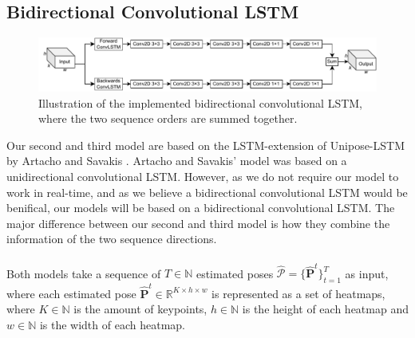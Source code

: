 \documentclass[./main.tex]{subfiles}
\begin{document}
\subsection{Bidirectional Convolutional LSTM}
\begin{figure}[htbp]
    \centering
    \includegraphics[width=\textwidth]{./entities/bi_conv_lstm.pdf}
    \caption{Illustration of the implemented bidirectional convolutional LSTM, where the two sequence orders are summed together.}
    \label{fig:bi_conv_lstm}
\end{figure}

\noindent Our second and third model are based on the LSTM-extension of Unipose-LSTM by Artacho and Savakis \cite{https://doi.org/10.48550/arxiv.2001.08095}. Artacho and Savakis' model was based on a unidirectional convolutional LSTM. However, as we do not require our model to work in real-time, and as we believe a bidirectional convolutional LSTM would be benifical, our models will be based on a bidirectional convolutional LSTM. The major difference between our second and third model is how they combine the information of the two sequence directions.
\\
\\
Both models take a sequence of $T \in \mathbb{N}$ estimated poses $\hat{\mathcal{P}} = \{\hat{\bm{P}}^t\}_{t = 1} ^T$ as input, where each estimated pose $\hat{\bm{P}}^t \in \mathbb{R}^{K \times h \times w}$ is represented as a set of heatmaps, where $K \in \mathbb{N}$ is the amount of keypoints, $h \in \mathbb{N}$ is the height of each heatmap and $w \in \mathbb{N}$ is the width of each heatmap. 
\end{document}
